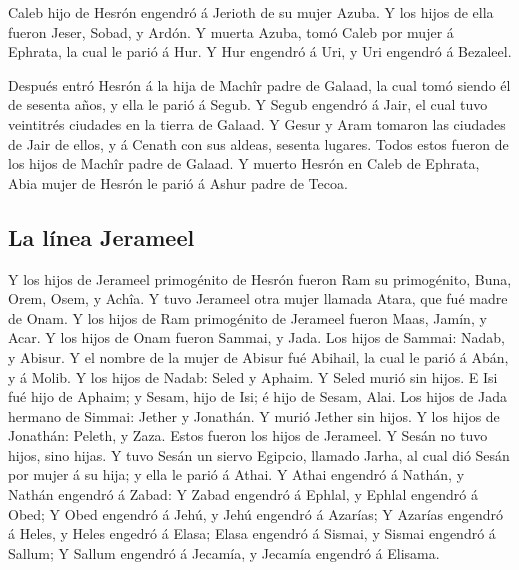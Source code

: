  Caleb hijo de Hesrón engendró á Jerioth de su mujer Azuba.
Y los hijos de ella fueron Jeser, Sobad, y Ardón.  Y muerta
Azuba, tomó Caleb por mujer á Ephrata, la cual le parió á Hur.
 Y Hur engendró á Uri, y Uri engendró á Bezaleel.

 Después entró Hesrón á la hija de Machîr padre de Galaad,
la cual tomó siendo él de sesenta años, y ella le parió á Segub.
 Y Segub engendró á Jair, el cual tuvo veintitrés ciudades
en la tierra de Galaad.  Y Gesur y Aram tomaron las
ciudades de Jair de ellos, y á Cenath con sus aldeas, sesenta lugares.
Todos estos fueron de los hijos de Machîr padre de Galaad. 
Y muerto Hesrón en Caleb de Ephrata, Abia mujer de Hesrón le parió á
Ashur padre de Tecoa.

\hypertarget{la-luxednea-jerameel}{%
\subsection{La línea Jerameel}\label{la-luxednea-jerameel}}

 Y los hijos de Jerameel primogénito de Hesrón fueron Ram
su primogénito, Buna, Orem, Osem, y Achîa.  Y tuvo Jerameel
otra mujer llamada Atara, que fué madre de Onam.  Y los
hijos de Ram primogénito de Jerameel fueron Maas, Jamín, y Acar.
 Y los hijos de Onam fueron Sammai, y Jada. Los hijos de
Sammai: Nadab, y Abisur.  Y el nombre de la mujer de Abisur
fué Abihail, la cual le parió á Abán, y á Molib.  Y los
hijos de Nadab: Seled y Aphaim. Y Seled murió sin hijos.  E
Isi fué hijo de Aphaim; y Sesam, hijo de Isi; é hijo de Sesam, Alai.
 Los hijos de Jada hermano de Simmai: Jether y Jonathán. Y
murió Jether sin hijos.  Y los hijos de Jonathán: Peleth, y
Zaza. Estos fueron los hijos de Jerameel.  Y Sesán no tuvo
hijos, sino hijas.  Y tuvo Sesán un siervo Egipcio, llamado
Jarha, al cual dió Sesán por mujer á su hija; y ella le parió á Athai.
 Y Athai engendró á Nathán, y Nathán engendró á Zabad:
 Y Zabad engendró á Ephlal, y Ephlal engendró á Obed;
 Y Obed engendró á Jehú, y Jehú engendró á Azarías;
 Y Azarías engendró á Heles, y Heles engedró á Elasa;
 Elasa engendró á Sismai, y Sismai engendró á Sallum;
 Y Sallum engendró á Jecamía, y Jecamía engendró á Elisama.

